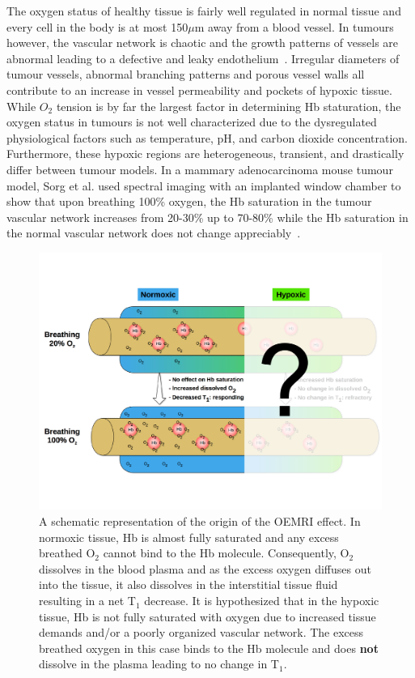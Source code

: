 The oxygen status of healthy tissue is fairly well regulated in normal tissue and every cell in the body is at most 150$\mu$m away from a blood vessel. 
In tumours however, the vascular network is chaotic and the growth patterns of vessels are abnormal leading to a defective and leaky endothelium~\cite{McDonald:2002ut}. 
Irregular diameters of tumour vessels, abnormal branching patterns and porous vessel walls all contribute to an increase in vessel permeability and pockets of hypoxic tissue. 
While $O_2$ tension is by far the largest factor in determining Hb staturation, the oxygen status in tumours is not well characterized due to the dysregulated physiological factors such as temperature, pH, and carbon dioxide concentration. 
Furthermore, these hypoxic regions are heterogeneous, transient, and drastically differ between tumour models. 
In a mammary adenocarcinoma mouse tumour model, Sorg et al. used spectral imaging with an implanted window chamber to show that upon breathing 100\% oxygen, the \acs{Hb} saturation in the tumour vascular network increases from 20-30\% up to 70-80\% while the \acs{Hb} saturation in the normal vascular network does not change appreciably~\cite{Sorg:2008eg}.

    	\begin{figure}
    		\begin{center}
    		\includegraphics[width=\textwidth]{./oemri_thesis1/oemri_thesis1-images/oemriDark.pdf}
    		\caption{A schematic representation of the origin of the OEMRI effect. In normoxic tissue, \acs{Hb} is almost fully saturated and any excess breathed O$_2$ cannot bind to the \acs{Hb} molecule. Consequently, O$_2$ dissolves in the blood plasma and as the excess oxygen diffuses out into the tissue, it also dissolves in the interstitial tissue fluid resulting in a net T$_1$ decrease. It is hypothesized that in the hypoxic tissue, \acs{Hb} is not fully saturated with oxygen due to increased tissue demands and/or a poorly organized vascular network. The excess breathed oxygen in this case binds to the \acs{Hb} molecule and does \textbf{not} dissolve in the plasma leading to no change in T$_1$.}
    		\label{oemri}
    		\end{center}
    	\end{figure}

